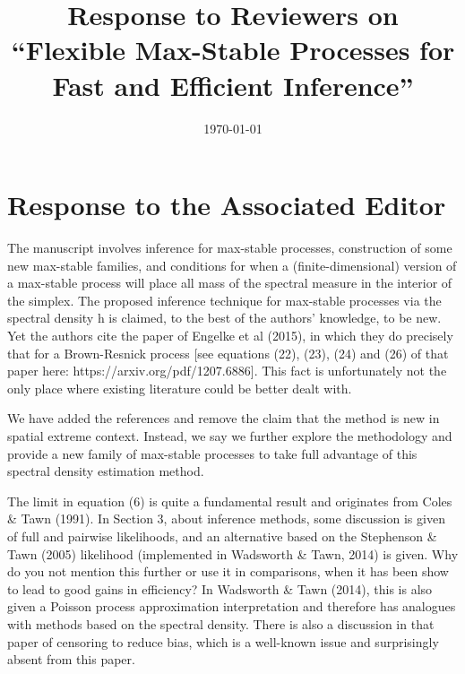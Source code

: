 \documentclass[12pt
]{article}
\author{}
\date{\vspace{-2.5em}}
\title{Response to Reviewers on ``Flexible Max-Stable Processes for Fast and Efficient Inference''}
\date{\today}
\begin{document}
\maketitle

\section*{Response to the Associated Editor}

\medskip

\begin{Comments}
The manuscript involves inference for max-stable processes, construction of some new max-stable families, and conditions for when a (finite-dimensional) version of a max-stable process will place all mass of the spectral measure in the interior of the simplex. The proposed inference technique for max-stable processes via the spectral density h is claimed, to the best of the authors' knowledge, to be new. Yet the authors cite the paper of Engelke et al (2015), in which they do precisely that for a Brown-Resnick process [see equations (22), (23), (24) and (26) of that paper here: https://arxiv.org/pdf/1207.6886]. This fact is unfortunately not the only place where existing literature could be better dealt with.
\end{Comments}

\begin{Res}
We have added the references \citep{Engelke.etal:2015} and remove the claim that the method is new in spatial extreme context. Instead, we say we further explore the methodology and provide a new family of max-stable processes to take full advantage of this spectral density estimation method.  
\end{Res} 

\begin{Comments}
The limit in equation (6) is quite a fundamental result and originates from Coles \& Tawn (1991). In Section 3, about inference methods, some discussion is given of full and pairwise likelihoods, and an alternative based on the Stephenson \& Tawn (2005) likelihood (implemented in Wadsworth \& Tawn, 2014) is given. Why do you not mention this further or use it in comparisons, when it has been show to lead to good gains in efficiency? In Wadsworth \& Tawn (2014), this is also given a Poisson process approximation interpretation and therefore has analogues with methods based on the spectral density. There is also a discussion in that paper of censoring to reduce bias, which is a well-known issue and surprisingly absent from this paper.
\end{Comments}
\end{document}
